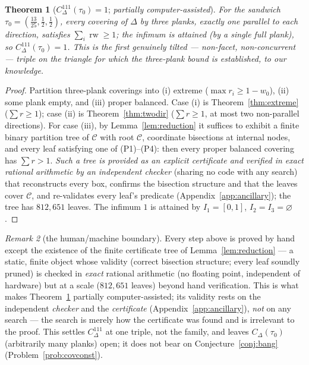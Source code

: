 \documentclass[11pt,reqno]{amsart}
\theoremstyle{plain}
\newtheorem{theorem}{Theorem}[section]
\theoremstyle{definition}
\theoremstyle{remark}
\newtheorem{remark}[theorem]{Remark}
\newcommand{\rw}{\operatorname{rw}}
\begin{document}
\begin{theorem}[$C^{111}_\Delta(\tau_0)=1$; \emph{partially computer-assisted}]
\label{thm:sandwichbang}
For the sandwich $\tau_0=(\tfrac{13}{25},\tfrac12,\tfrac12)$, every covering of
$\Delta$ by three planks, exactly one parallel to each direction, satisfies
$\sum_i\rw\ge1$; the infimum is attained (by a single full plank), so
$C^{111}_\Delta(\tau_0)=1$. This is the first genuinely tilted --- non-facet,
non-concurrent --- triple on the triangle for which the three-plank bound is
established, to our knowledge.
\end{theorem}
\begin{proof}
Partition three-plank coverings into (i) extreme ($\max r_i\ge1-w_0$), (ii)
some plank empty, and (iii) proper balanced. Case (i) is
Theorem~\ref{thm:extreme} ($\sum r\ge1$); case (ii) is
Theorem~\ref{thm:twodir} ($\sum r\ge1$, at most two non-parallel directions).
For case (iii), by Lemma~\ref{lem:reduction} it suffices to exhibit a finite
binary partition tree of $\mathcal C$ with root $\mathcal C$, coordinate
bisections at internal nodes, and every leaf satisfying one of (P1)--(P4):
then every proper balanced covering has $\sum r>1$. \emph{Such a tree is
provided as an explicit certificate and verified in exact rational arithmetic
by an independent checker} (sharing no code with any search) that reconstructs
every box, confirms the bisection structure and that the leaves cover
$\mathcal C$, and re-validates every leaf's predicate
(Appendix~\ref{app:ancillary}); the tree has $812{,}651$ leaves. The infimum
$1$ is attained by $I_1=[0,1]$, $I_2=I_3=\varnothing$.
\end{proof}

\begin{remark}[the human/machine boundary]\label{rem:boundary}
Every step above is proved by hand except the existence of the finite
certificate tree of Lemma~\ref{lem:reduction} --- a static, finite object whose
validity (correct bisection structure; every leaf soundly pruned) is checked
in \emph{exact} rational arithmetic (no floating point, independent of
hardware) but at a scale ($812{,}651$ leaves) beyond hand verification. This is
what makes Theorem~\ref{thm:sandwichbang} partially computer-assisted; its
validity rests on the independent \emph{checker} and the \emph{certificate}
(Appendix~\ref{app:ancillary}), \emph{not} on any search --- the search is
merely how the certificate was found and is irrelevant to the proof. This
settles $C^{111}_\Delta$ at one triple, not the family, and leaves
$C_\Delta(\tau_0)$ (arbitrarily many planks) open; it does not bear on
Conjecture~\ref{conj:bang} (Problem~\ref{prob:covconst}).
\end{remark}
\end{document}
